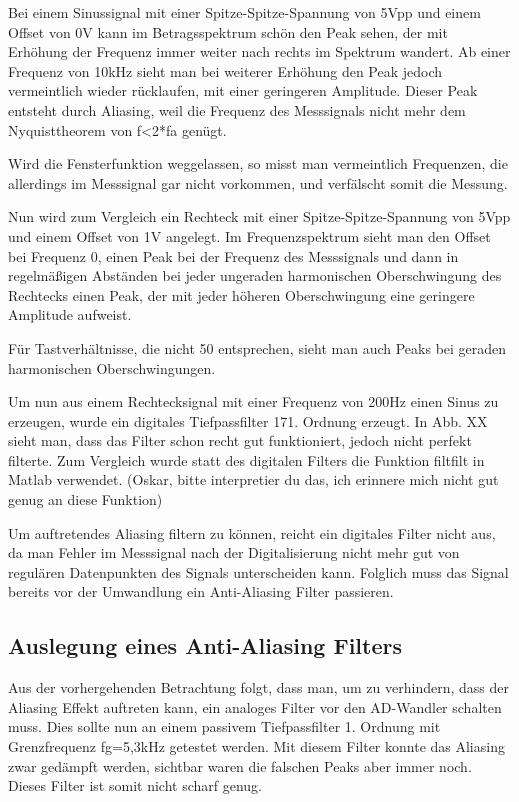 Bei einem Sinussignal mit einer Spitze-Spitze-Spannung von 5Vpp und einem Offset von 0V kann im Betragsspektrum schön den Peak sehen, der mit Erhöhung der Frequenz immer weiter nach rechts im Spektrum wandert. Ab einer Frequenz von 10kHz sieht man bei weiterer Erhöhung den Peak jedoch vermeintlich wieder rücklaufen, mit einer geringeren Amplitude. Dieser Peak entsteht durch Aliasing, weil die Frequenz des Messsignals nicht mehr dem Nyquisttheorem von f<2*fa genügt.

Wird die Fensterfunktion weggelassen, so misst man vermeintlich Frequenzen, die allerdings im Messsignal gar nicht vorkommen, und verfälscht somit die Messung.

Nun wird zum Vergleich ein Rechteck mit einer Spitze-Spitze-Spannung von 5Vpp und einem Offset von 1V angelegt. Im Frequenzspektrum sieht man den Offset bei Frequenz 0, einen Peak bei der Frequenz des Messsignals und dann in regelmäßigen Abständen bei jeder ungeraden harmonischen Oberschwingung des Rechtecks einen Peak, der mit jeder höheren Oberschwingung eine geringere Amplitude aufweist.

Für Tastverhältnisse, die nicht 50 entsprechen, sieht man auch Peaks bei geraden harmonischen Oberschwingungen.

Um nun aus einem Rechtecksignal mit einer Frequenz von 200Hz einen Sinus zu erzeugen, wurde ein digitales Tiefpassfilter 171. Ordnung erzeugt. In Abb. XX sieht man, dass das Filter schon recht gut funktioniert, jedoch nicht perfekt filterte. Zum Vergleich wurde statt des digitalen Filters die Funktion filtfilt in Matlab verwendet. (Oskar, bitte interpretier du das, ich erinnere mich nicht gut genug an diese Funktion)

Um auftretendes Aliasing filtern zu können, reicht ein digitales Filter nicht aus, da man Fehler im Messsignal nach der Digitalisierung nicht mehr gut von regulären Datenpunkten des Signals unterscheiden kann. Folglich muss das Signal bereits vor der Umwandlung ein Anti-Aliasing Filter passieren.

\subsection{Auslegung eines Anti-Aliasing Filters}

Aus der vorhergehenden Betrachtung folgt, dass man, um zu verhindern, dass der Aliasing Effekt auftreten kann, ein analoges Filter vor den AD-Wandler schalten muss. Dies sollte nun an einem passivem Tiefpassfilter 1. Ordnung mit Grenzfrequenz fg=5,3kHz getestet werden. Mit diesem Filter konnte das Aliasing zwar gedämpft werden, sichtbar waren die falschen Peaks aber immer noch. Dieses Filter ist somit nicht scharf genug.

